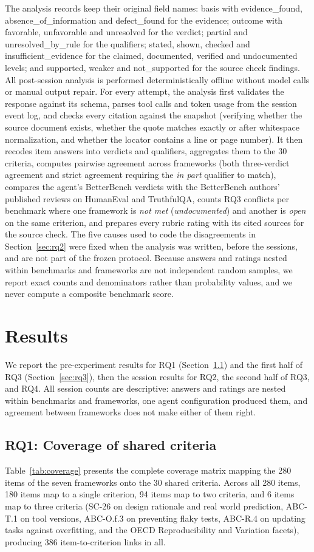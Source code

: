\documentclass[10pt,conference]{IEEEtran}
\begin{document}
The analysis records keep their original field names: basis with evidence\_found, absence\_of\_information and defect\_found for the evidence; outcome with favorable, unfavorable and unresolved for the verdict; partial and unresolved\_by\_rule for the qualifiers; stated, shown, checked and insufficient\_evidence for the claimed, documented, verified and undocumented levels; and supported, weaker and not\_supported for the source check findings. All post-session analysis is performed deterministically offline without model calls or manual output repair. For every attempt, the analysis first validates the response against its schema, parses tool calls and token usage from the session event log, and checks every citation against the snapshot (verifying whether the source document exists, whether the quote matches exactly or after whitespace normalization, and whether the locator contains a line or page number). It then recodes item answers into verdicts and qualifiers, aggregates them to the 30 criteria, computes pairwise agreement across frameworks (both three-verdict agreement and strict agreement requiring the \emph{in part} qualifier to match), compares the agent's BetterBench verdicts with the BetterBench authors' published reviews on HumanEval and TruthfulQA, counts RQ3 conflicts per benchmark where one framework is \emph{not met} (\emph{undocumented}) and another is \emph{open} on the same criterion, and prepares every rubric rating with its cited sources for the source check. The five causes used to code the disagreements in Section~\ref{sec:rq2} were fixed when the analysis was written, before the sessions, and are not part of the frozen protocol. Because answers and ratings nested within benchmarks and frameworks are not independent random samples, we report exact counts and denominators rather than probability values, and we never compute a composite benchmark score.

\section{Results}
We report the pre-experiment results for RQ1 (Section~\ref{sec:rq1}) and the first half of RQ3 (Section~\ref{sec:rq3}), then the session results for RQ2, the second half of RQ3, and RQ4. All session counts are descriptive: answers and ratings are nested within benchmarks and frameworks, one agent configuration produced them, and agreement between frameworks does not make either of them right.

\subsection{RQ1: Coverage of shared criteria}
\label{sec:rq1}
Table~\ref{tab:coverage} presents the complete coverage matrix mapping the 280 items of the seven frameworks onto the 30 shared criteria. Across all 280 items, 180 items map to a single criterion, 94 items map to two criteria, and 6 items map to three criteria (SC-26 on design rationale and real world prediction, ABC-T.1 on tool versions, ABC-O.f.3 on preventing flaky tests, ABC-R.4 on updating tasks against overfitting, and the OECD Reproducibility and Variation facets), producing 386 item-to-criterion links in all.
\end{document}
